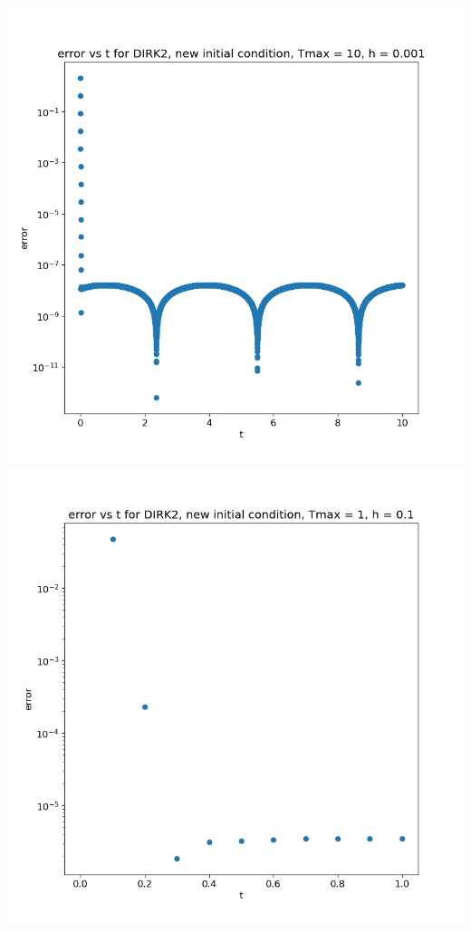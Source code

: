 \documentclass{article}
\begin{document}
\begin{enumerate}
\begin{enumerate}[label=(\alph*)]
\begin{center}
		\includegraphics[scale=.3]{hw3 dirk2 err vs t graph 3}
		\includegraphics[scale=.3]{hw3 dirk2 err vs t graph 4}

\end{center}
\end{enumerate}
\end{enumerate}
\end{document}

